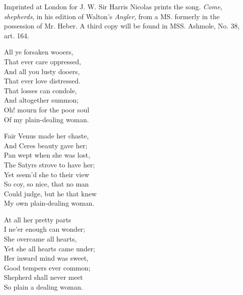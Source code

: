 
Imprinted at London for J. W. Sir Harris Nicolas prints the song. \textit{Come,
shepherds}, in his edition of Walton’s \textit{Angler}, from a MS. formerly in the possession
of Mr. Heber. A third copy will be found in MSS. Ashmole, No. 38,
art. 164.



\settowidth{\versewidth}{The Satyrs strove to have her;}
\begin{dcverse}
\begin{altverse}
All ye forsaken wooers,\\
That ever care oppressed,\\
And all you lusty dooers,\\
That ever love distressed.\\
That losses can condole,\\
And altogether summon;\\
Oh! mourn for the poor soul\\
Of my plain-dealing woman.
\end{altverse}

\begin{altverse}
Fair Venus made her chaste,\\
And Ceres beauty gave her;\\
Pan wept when she was lost,\\
The Satyrs strove to have her;\\
Yet seem’d she to their view\\
So coy, so nice, that no man\\
Could judge, but he that knew\\
My own plain-dealing woman.
\end{altverse}

\begin{altverse}
At all her pretty parts\\
I ne’er enough can wonder;\\
She overcame all hearts,\\
Yet she all hearts came under;\\
Her inward mind was sweet,\\
Good tempers ever common;\\
Shepherd shall never meet\\
So plain a dealing woman.
\end{altverse}
\end{dcverse}
\pagebreak

